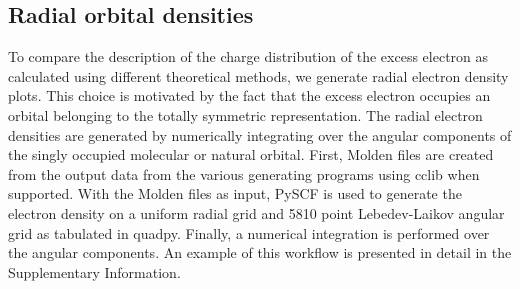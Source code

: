 \subsection{Radial orbital densities}
To compare the description of the charge distribution of the excess electron as calculated using different theoretical methods, we generate radial electron density plots.
This choice is motivated by the fact that the excess electron occupies an orbital belonging to the totally symmetric representation.
The radial electron densities are generated by numerically integrating over the angular components of the singly occupied molecular or natural orbital.
First, Molden files are created from the output data from the various generating programs using cclib when supported.\cite{10.1002/jcc.20823}
With the Molden files as input, PySCF is used to generate the electron density on a uniform radial grid and 5810 point Lebedev-Laikov angular grid as tabulated in quadpy.\cite{10.1002/wcms.1340,10.1063/5.0006074,lebedevlaikov,quadpy}
Finally, a numerical integration is performed over the angular components. 
An example of this workflow is presented in detail in the Supplementary Information.


